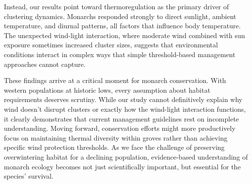 Instead, our results point toward thermoregulation as the primary driver of clustering dynamics. Monarchs responded strongly to direct sunlight, ambient temperature, and diurnal patterns, all factors that influence body temperature. The unexpected wind-light interaction, where moderate wind combined with sun exposure sometimes increased cluster sizes, suggests that environmental conditions interact in complex ways that simple threshold-based management approaches cannot capture.

These findings arrive at a critical moment for monarch conservation. With western populations at historic lows, every assumption about habitat requirements deserves scrutiny. While our study cannot definitively explain why wind doesn't disrupt clusters or exactly how the wind-light interaction functions, it clearly demonstrates that current management guidelines rest on incomplete understanding. Moving forward, conservation efforts might more productively focus on maintaining thermal diversity within groves rather than achieving specific wind protection thresholds. As we face the challenge of preserving overwintering habitat for a declining population, evidence-based understanding of monarch ecology becomes not just scientifically important, but essential for the species' survival.
